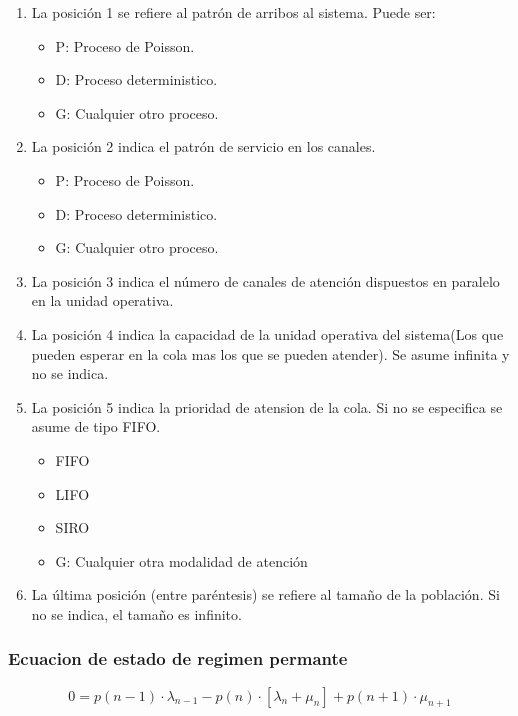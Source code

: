 \documentclass{article}
\begin{document}
\begin{enumerate}
    \item La posición 1 se refiere al patrón de arribos al sistema. Puede ser:
    \begin{itemize}
        \item P: Proceso de Poisson.
        \item D: Proceso deterministico.
        \item G: Cualquier otro proceso.
    \end{itemize}
    \item La posición 2 indica el patrón de servicio en los canales.
    \begin{itemize}
        \item P: Proceso de Poisson.
        \item D: Proceso deterministico.
        \item G: Cualquier otro proceso.
    \end{itemize}
    \item La posición 3 indica el número de canales de atención dispuestos en paralelo en la unidad operativa.
    \item La posición 4 indica la capacidad de la unidad operativa del sistema(Los que pueden esperar en la cola mas los que se pueden atender). Se asume infinita y no se indica.
    \item La posición 5 indica la prioridad de atension de la cola.  Si no se especifica se asume de tipo FIFO.
    \begin{itemize}
        \item FIFO
        \item LIFO
        \item SIRO
        \item G: Cualquier otra modalidad de atención
    \end{itemize}
    \item La última posición (entre paréntesis) se refiere al tamaño de la población. Si no se indica, el tamaño es infinito.
\end{enumerate}


\subsubsection{Ecuacion de estado de regimen permante}

\begin{equation}
    0 = p(n-1) \cdot \lambda_{n-1} - p(n) \cdot [\lambda_n + \mu_n] + p(n+1) \cdot \mu_{n+1}
\end{equation}
\end{document}

